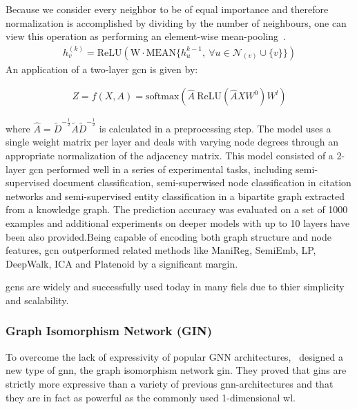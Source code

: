 Because we consider every neighbor to be of equal importance and therefore normalization is accomplished
by dividing by the number of neighbours, one can view this operation as performing an element-wise
mean-pooling~\cite{Xu2019}.
\begin{align*}
    h_{v}^{(k)} = \mathrm{ReLU}(\mathrm{W} \cdot\mathrm{MEAN} \{h_{u}^{k-1},\ \forall{u} \in \mathcal{N}_{(v)} \cup \{v\}\})
\end{align*}
An application of a two-layer \ac{gcn} is given by:

\begin{align*}
    Z = f(X,A) = \mathrm{softmax} (\hat{A}\ \mathrm{ReLU}(\hat{A}XW^{0})W^{l})
\end{align*}

where $\hat{A} = \tilde{D}^{-\frac{1}{2}}\tilde{A}\tilde{D}^{-\frac{1}{2}}$
is calculated in a preprocessing step. The model uses a single weight matrix per layer and
deals with varying node degrees through an appropriate normalization of the adjacency matrix.
This model consisted of a 2-layer \ac{gcn} performed well in a series of experimental tasks, including semi-supervised document classification, semi-superwised node classification in citation networks and semi-supervised entity classification in a bipartite graph extracted from a knowledge graph.
The prediction accuracy was evaluated on a set of 1000 examples and additional experiments on deeper models with up to 10 layers have been also provided.Being capable of encoding both graph structure and node features,  \ac{gcn} outperformed related methods like ManiReg, SemiEmb, LP, DeepWalk, ICA and Platenoid by a significant margin.

\Acfp{gcn} are widely and successfully used today in many fiels due to thier simplicity and scalability.

\subsubsection{Graph Isomorphism Network (GIN)}
\label{sec:related:architectures:gin}
To overcome the lack of expressivity of popular GNN architectures,~\cite{Xu2019} designed a new type of \ac{gnn}, the graph isomorphism network \ac{gin}. They proved that \acp{gin} are strictly
more expressive than a variety of previous \ac{gnn}-architectures and that they are in fact as powerful as the commonly used 1-dimensional \acf{wl}.

